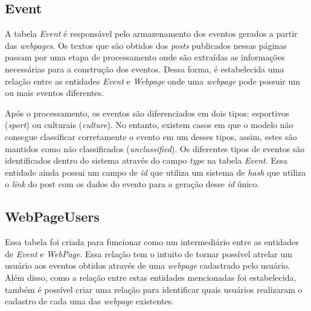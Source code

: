 \subsection{Event}

A tabela \textit{Event} é responsável pelo armazenamento dos eventos gerados a
partir das \textit{webpages}. Os textos que são obtidos dos \textit{posts}
publicados nessas páginas passam por uma etapa de processamento onde são
extraídas as informações necessárias para a construção dos eventos. Dessa
forma, é estabelecida uma relação entre as entidades \textit{Event} e
\textit{Webpage} onde uma \textit{webpage} pode possuir um ou mais eventos
diferentes.

Após o processamento, os eventos são diferenciados em dois tipos: esportivos
(\textit{sport}) ou culturais (\textit{culture}). No entanto, existem casos em
que o modelo não consegue classificar corretamente o evento em um desses tipos,
assim, estes são mantidos como não classificados (\textit{unclassified}). Os
diferentes tipos de eventos são identificados dentro do sistema através do
campo \textit{type} na tabela \textit{Event}. Essa entidade ainda possui um
campo de \textit{id} que utiliza um sistema de \textit{hash} que utiliza o
\textit{link} do post com os dados do evento para a geração desse \textit{id}
único.

\subsection{WebPageUsers}
\label{sec:WebPageUsers}

Essa tabela foi criada para funcionar como um intermediário entre as entidades
de \textit{Event} e \textit{WebPage}. Essa relação tem o intuito de tornar
possível atrelar um usuário aos eventos obtidos através de uma \textit{webpage}
cadastrado pelo usuário. Além disso, como a relação entre estas entidades
mencionadas foi estabelecida, também é possível criar uma relação para
identificar quais usuários realizaram o cadastro de cada uma das
\textit{webpage} existentes.
